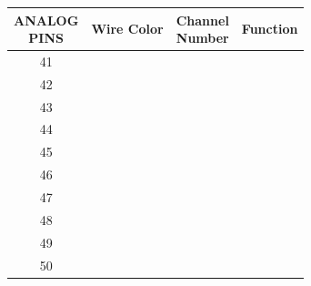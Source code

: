\documentclass[12pt]{article}
\begin{document}
\begin{center}
\begin{tabular}{ |c|c|c|c| }
  
\end{tabular}





\end{center}


\clearpage


\begin{center}


\begin{tabular}{ |c|c|c|c| }


  \hline
  \thead{ANALOG \\ PINS} & \textbf{Wire Color} & \thead{Channel \\ Number} & \textbf{Function} \\ \hline
      
41 &	& & \\ \hline
42 &	& & \\ \hline
43 &	& & \\ \hline
44 &	& & \\ \hline
45 &	& & \\ \hline
46 &	& & \\ \hline
47 &	& & \\ \hline
48 &	& & \\ \hline
49 &	& & \\ \hline
50 &	& & \\ \hline


  
\end{tabular}





\end{center}
\end{document}
